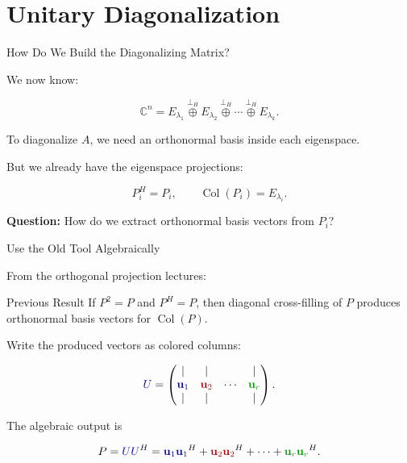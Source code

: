 \documentclass[10pt]{beamer}
\theoremstyle{definition}
\newcommand{\x}[1]{\alert{\textbf{#1}}}
\newcommand{\rd}[1]{{\color{red!70!black}#1}}
\newcommand{\bl}[1]{{\color{blue!70!black}#1}}
\newcommand{\gn}[1]{{\color{green!60!black}#1}}
\newcommand{\orthoplus}{\mathbin{\overset{\perp_H}{\oplus}}}
\begin{document}
\section{Unitary Diagonalization}

\begin{frame}{How Do We Build the Diagonalizing Matrix?}

We now know:

$$
\mathbb{C}^n
=E_{\lambda_1}\orthoplus E_{\lambda_2}\orthoplus\cdots\orthoplus E_{\lambda_k}.
$$

\vfill\pause

To diagonalize $A$, we need an orthonormal basis inside each eigenspace.

\vfill

But we already have the eigenspace projections:

$$
P_i^H=P_i,
\qquad
\operatorname{Col}(P_i)=E_{\lambda_i}.
$$

\vfill\pause

\x{Question:} How do we extract orthonormal basis vectors from $P_i$?

\end{frame}


\begin{frame}{Use the Old Tool Algebraically}

From the orthogonal projection lectures:

\begin{block}{Previous Result}
If $P^2=P$ and $P^H=P$, then diagonal cross-filling of $P$ produces
orthonormal basis vectors for $\operatorname{Col}(P)$.
\end{block}

\vfill\pause

Write the produced vectors as colored columns:

$$
\bl{U}=
\begin{pmatrix}
|&|& &|\\
\bl{\mathbf u_1}&\rd{\mathbf u_2}&\cdots&\gn{\mathbf u_r}\\
|&|& &|
\end{pmatrix}.
$$

\vfill

The algebraic output is

$$
P=\bl{U}\bl{U}^H
=\bl{\mathbf u_1}\bl{\mathbf u_1}^H
+\rd{\mathbf u_2}\rd{\mathbf u_2}^H
+\cdots+
\gn{\mathbf u_r}\gn{\mathbf u_r}^H.
$$

\end{frame}
\end{document}

